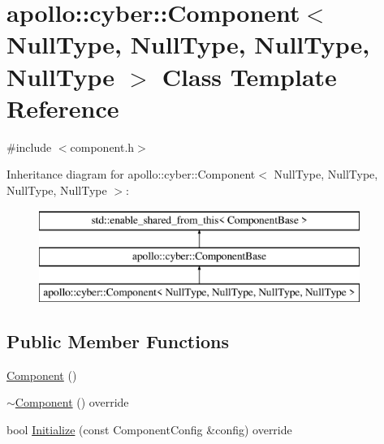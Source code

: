 \hypertarget{classapollo_1_1cyber_1_1Component_3_01NullType_00_01NullType_00_01NullType_00_01NullType_01_4}{\section{apollo\-:\-:cyber\-:\-:Component$<$ Null\-Type, Null\-Type, Null\-Type, Null\-Type $>$ Class Template Reference}
\label{classapollo_1_1cyber_1_1Component_3_01NullType_00_01NullType_00_01NullType_00_01NullType_01_4}
}


{\ttfamily \#include $<$component.\-h$>$}

Inheritance diagram for apollo\-:\-:cyber\-:\-:Component$<$ Null\-Type, Null\-Type, Null\-Type, Null\-Type $>$\-:\begin{figure}[H]
\begin{center}
\leavevmode
\includegraphics[height=3.000000cm]{classapollo_1_1cyber_1_1Component_3_01NullType_00_01NullType_00_01NullType_00_01NullType_01_4}
\end{center}
\end{figure}
\subsection*{Public Member Functions}
\begin{DoxyCompactItemize}
\item 
\hyperlink{classapollo_1_1cyber_1_1Component_3_01NullType_00_01NullType_00_01NullType_00_01NullType_01_4_ae98b0732d4a874991a0fef7f93fb0fc5}{Component} ()
\item 
\hyperlink{classapollo_1_1cyber_1_1Component_3_01NullType_00_01NullType_00_01NullType_00_01NullType_01_4_a4905afe141dbe487ae0a9ded030a98ea}{$\sim$\-Component} () override
\item 
bool \hyperlink{classapollo_1_1cyber_1_1Component_3_01NullType_00_01NullType_00_01NullType_00_01NullType_01_4_a8890f8e7c2b7d81f70802e879ff71c22}{Initialize} (const Component\-Config \&config) override
\end{DoxyCompactItemize}

